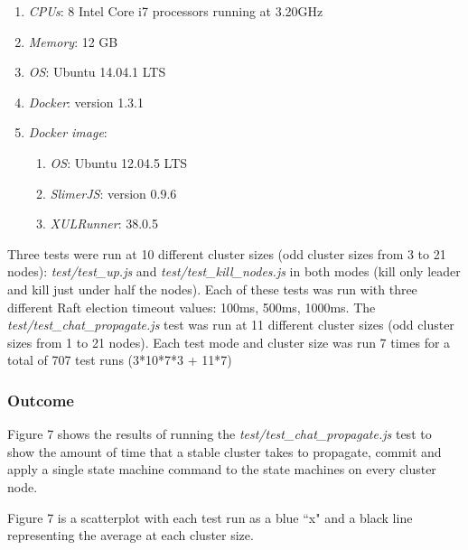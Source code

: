 \documentclass[9pt]{extarticle}
\begin{document}
\begin{multicols}{2}
\begin{enumerate}
    \item \emph{CPUs}: 8 Intel Core i7 processors running at 3.20GHz
    \item \emph{Memory}: 12 GB
    \item \emph{OS}: Ubuntu 14.04.1 LTS
    \item \emph{Docker}: version 1.3.1
    \item \emph{Docker image}:
    \begin{enumerate}
        \item \emph{OS}: Ubuntu 12.04.5 LTS
        \item \emph{SlimerJS}: version 0.9.6
        \item \emph{XULRunner}: 38.0.5
    \end{enumerate}
\end{enumerate}

Three tests were run at 10 different cluster sizes (odd cluster sizes
from 3 to 21 nodes): \emph{test/test\_up.js} and
\emph{test/test\_kill\_nodes.js} in both modes (kill only leader and kill just
under half the nodes).
Each of these tests was run with three different Raft election
timeout values: 100ms, 500ms, 1000ms. The
\emph{test/test\_chat\_propagate.js} test was run at
11 different cluster sizes (odd cluster sizes from 1 to 21 nodes).
Each test mode and cluster size was run 7 times for a total of 707
test runs (3*10*7*3 + 11*7)

\subsubsection{Outcome}

Figure 7 shows the results of running the
\emph{test/test\_chat\_propagate.js} test to show the amount of time
that a stable cluster takes to propagate, commit and apply a single
state machine command to the state machines on every cluster node.

Figure 7 is a scatterplot with each test run as a blue ``x" and a black
line representing the average at each cluster size.

\begin{center}
\label{fig:propagate}
\end{center}


\end{multicols}
\end{document}

